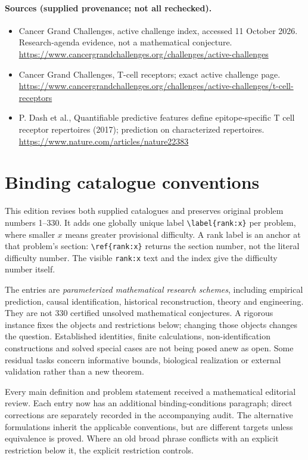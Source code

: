 \documentclass[11pt]{article}
\begin{document}
\paragraph{Sources (supplied provenance; not all rechecked).}
\begin{itemize}
\item Cancer Grand Challenges, active challenge index, accessed 11 October 2026. Research-agenda evidence, not a mathematical conjecture. \url{https://www.cancergrandchallenges.org/challenges/active-challenges}
\item Cancer Grand Challenges, T-cell receptors; exact active challenge page. \url{https://www.cancergrandchallenges.org/challenges/active-challenges/t-cell-receptors}
\item P. Dash et al., Quantifiable predictive features define epitope-specific T cell receptor repertoires (2017); prediction on characterized repertoires. \url{https://www.nature.com/articles/nature22383}
\end{itemize}


\section*{Binding catalogue conventions}
This edition revises both supplied catalogues and preserves original problem numbers 1--330. It adds one globally unique label \verb|\label{rank:x}| per problem, where smaller $x$ means greater provisional difficulty. A rank label is an anchor at that problem's section: \verb|\ref{rank:x}| returns the section number, not the literal difficulty number. The visible \texttt{rank:x} text and the index give the difficulty number itself.

The entries are \emph{parameterized mathematical research schemes}, including empirical prediction, causal identification, historical reconstruction, theory and engineering. They are not 330 certified unsolved mathematical conjectures. A rigorous instance fixes the objects and restrictions below; changing those objects changes the question. Established identities, finite calculations, non-identification constructions and solved special cases are not being posed anew as open. Some residual tasks concern informative bounds, biological realization or external validation rather than a new theorem.

Every main definition and problem statement received a mathematical editorial review. Each entry now has an additional binding-conditions paragraph; direct corrections are separately recorded in the accompanying audit. The alternative formulations inherit the applicable conventions, but are different targets unless equivalence is proved. Where an old broad phrase conflicts with an explicit restriction below it, the explicit restriction controls.
\end{document}
